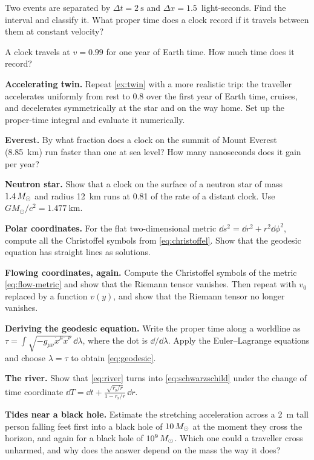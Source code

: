 \begin{problems}
\item {} Two events are separated by $\Delta t = \SI{2}{\second}$ and
  $\Delta x = 1.5$~light-seconds. Find the interval and classify it. What
  proper time does a clock record if it travels between them at constant
  velocity?
\item {} A clock travels at $v = 0.99$ for one year of Earth time. How much
  time does it record?
\item {} \textbf{Accelerating twin.} Repeat \cref{ex:twin} with a more
  realistic trip: the traveller accelerates uniformly from rest to $0.8$ over
  the first year of Earth time, cruises, and decelerates symmetrically at the
  star and on the way home. Set up the proper-time integral and evaluate it
  numerically.
\item {} \textbf{Everest.} By what fraction does a clock on the summit of
  Mount Everest (\SI{8.85}{\kilo\metre}) run faster than one at sea level?
  How many nanoseconds does it gain per year?
\item {}\label{prob:neutron-star} \textbf{Neutron star.} Show that a clock on
  the surface of a neutron star of mass $1.4\,M_{\odot}$ and radius
  \SI{12}{\kilo\metre} runs at 0.81 of the rate of a distant clock. Use
  $GM_{\odot}/c^{2} = \SI{1.477}{\kilo\metre}$.
\item {} \textbf{Polar coordinates.} For the flat two-dimensional metric
  $\dd s^{2} = \dd r^{2} + r^{2}\dd\phi^{2}$, compute all the Christoffel symbols
  from \cref{eq:christoffel}. Show that the geodesic equation has straight
  lines as solutions.
\item {} \textbf{Flowing coordinates, again.} Compute the Christoffel
  symbols of the metric \cref{eq:flow-metric} and show that the Riemann tensor
  vanishes. Then repeat with $v_{0}$ replaced by a function $v(y)$, and show
  that the Riemann tensor no longer vanishes.
\item {}\label{prob:geodesic} \textbf{Deriving the geodesic equation.}
  Write the proper time along a worldline as $\tau = \int
  \sqrt{-g_{\mu\nu}\dot x^{\mu}\dot x^{\nu}}\,\dd\lambda$, where the dot is
  $\dd/\dd\lambda$. Apply the Euler--Lagrange equations and choose
  $\lambda = \tau$ to obtain \cref{eq:geodesic}.
\item {} \textbf{The river.} Show that \cref{eq:river} turns into
  \cref{eq:schwarzschild} under the change of time coordinate
  $\dd T = \dd t + \frac{\sqrt{r_{\mathrm{s}}/r}}{1 - r_{\mathrm{s}}/r}\,\dd r$.
\item {} \textbf{Tides near a black hole.} Estimate the stretching
  acceleration across a \SI{2}{\metre} tall person falling feet first into a
  black hole of $10\,M_{\odot}$ at the moment they cross the horizon, and again for a
  black hole of $10^{9}\,M_{\odot}$. Which one could a traveller cross unharmed, and
  why does the answer depend on the mass the way it does?
\end{problems}

